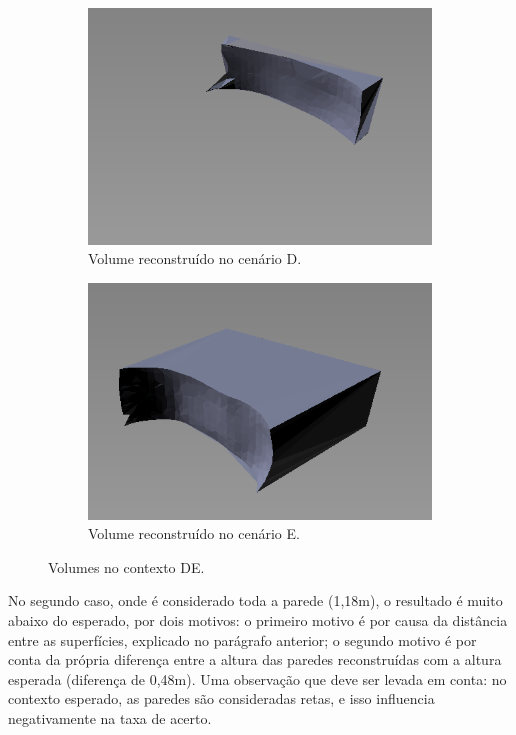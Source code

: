 \begin{figure}[H]
    \centering
    \begin{subfigure}[t]{0.48\textwidth}
        \includegraphics[width=\textwidth]{dados/figuras/volume_perto.png}
        \caption{Volume reconstruído no cenário D.}
    \end{subfigure}
    \begin{subfigure}[t]{0.48\textwidth}
        \includegraphics[width=\textwidth]{dados/figuras/volume_longe.png}
        \caption{Volume reconstruído no cenário E.}
    \end{subfigure}
    \caption{Volumes no contexto DE.}
    \label{fig:contexto_de}
\end{figure}

No segundo caso, onde é considerado toda a parede (1,18m), o resultado é muito abaixo do esperado, por dois motivos: o primeiro motivo é por causa da distância entre as superfícies, explicado no parágrafo anterior; o segundo motivo é por conta da própria diferença entre a altura das paredes reconstruídas com a altura esperada (diferença de 0,48m).
Uma observação que deve ser levada em conta: no contexto esperado, as paredes são consideradas retas, e isso influencia negativamente na taxa de acerto.

